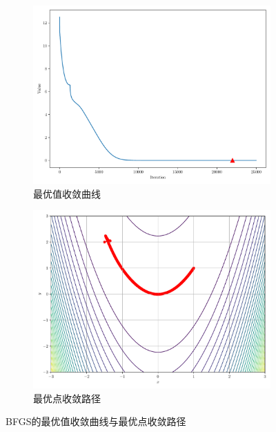 \begin{figure}[!ht]
    \centering
    \begin{subfigure}{0.4\textwidth}
        \centering
        \includegraphics[width=\textwidth]{figures/BFGS_loss.pdf}
        \caption{最优值收敛曲线}
    \end{subfigure}
    \begin{subfigure}{0.4\textwidth}
        \centering
        \includegraphics[width=\textwidth]{figures/BFGS_points.pdf}
        \caption{最优点收敛路径}
    \end{subfigure}
    \caption{BFGS的最优值收敛曲线与最优点收敛路径}
\end{figure}
